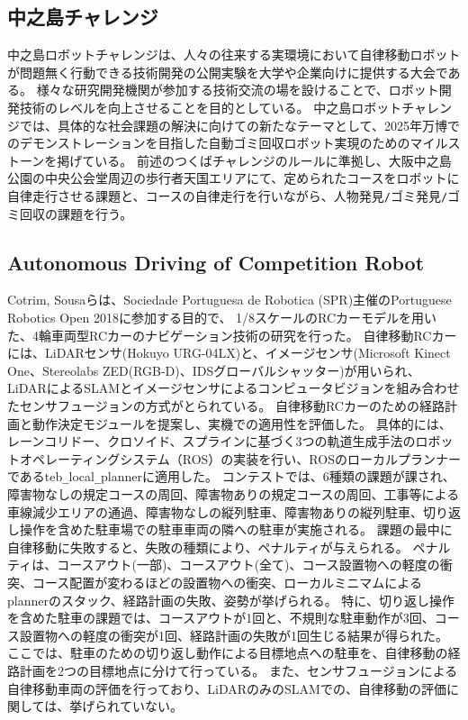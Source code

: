 \subsection{中之島チャレンジ}
中之島ロボットチャレンジ\cite{auto:nakanoshima}は、人々の往来する実環境において自律移動ロボットが問題無く行動できる技術開発の公開実験を大学や企業向けに提供する大会である。
様々な研究開発機関が参加する技術交流の場を設けることで、ロボット開発技術のレベルを向上させることを目的としている。
中之島ロボットチャレンジでは、具体的な社会課題の解決に向けての新たなテーマとして、2025年万博でのデモンストレーションを目指した自動ゴミ回収ロボット実現のためのマイルストーンを掲げている。
前述のつくばチャレンジのルールに準拠し、大阪中之島公園の中央公会堂周辺の歩行者天国エリアにて、定められたコースをロボットに自律走行させる課題と、コースの自律走行を行いながら、人物発見\verb|/|ゴミ発見\verb|/|ゴミ回収の課題を行う。

\subsection{Autonomous Driving of Competition Robot}
Cotrim, Sousaら\cite{auto:comp}は、Sociedade Portuguesa de Robotica (SPR)主催のPortuguese Robotics Open 2018に参加する目的で、
1/8スケールのRCカーモデルを用いた、4輪車両型RCカーのナビゲーション技術の研究を行った。
自律移動RCカーには、LiDARセンサ(Hokuyo URG-04LX)と、イメージセンサ(Microsoft Kinect One、Stereolabs ZED(RGB-D)、IDSグローバルシャッター)が用いられ、
LiDARによるSLAMとイメージセンサによるコンピュータビジョンを組み合わせたセンサフュージョンの方式がとられている。
自律移動RCカーのための経路計画と動作決定モジュールを提案し、実機での適用性を評価した。
具体的には、レーンコリドー、クロソイド、スプラインに基づく3つの軌道生成手法のロボットオペレーティングシステム（ROS）の実装を行い、ROSのローカルプランナーであるteb\verb|_|local\verb|_|plannerに適用した。
コンテストでは、6種類の課題が課され、障害物なしの規定コースの周回、障害物ありの規定コースの周回、工事等による車線減少エリアの通過、障害物なしの縦列駐車、障害物ありの縦列駐車、切り返し操作を含めた駐車場での駐車車両の隣への駐車が実施される。
課題の最中に自律移動に失敗すると、失敗の種類により、ペナルティが与えられる。
ペナルティは、コースアウト(一部)、コースアウト(全て)、コース設置物への軽度の衝突、コース配置が変わるほどの設置物への衝突、ローカルミニマムによるplannerのスタック、経路計画の失敗、姿勢が挙げられる。
特に、切り返し操作を含めた駐車の課題では、コースアウトが1回と、不規則な駐車動作が3回、コース設置物への軽度の衝突が1回、経路計画の失敗が1回生じる結果が得られた。
ここでは、駐車のための切り返し動作による目標地点への駐車を、自律移動の経路計画を2つの目標地点に分けて行っている。
また、センサフュージョンによる自律移動車両の評価を行っており、LiDARのみのSLAMでの、自律移動の評価に関しては、挙げられていない。

